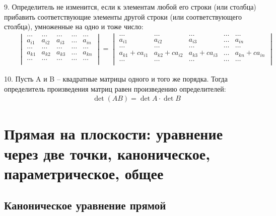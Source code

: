 \documentclass[12pt, fleqn]{extarticle}
\begin{document}
9. Определитель не изменится, если к элементам любой его строки (или столбца) прибавить соответствующие элементы другой строки (или соответствующего столбца), умноженные на одно и тоже число:
\begin{align*}
     &  &
    \begin{vmatrix}
        \dots  & \dots  & \dots  & \dots & \dots  \\
        a_{i1} & a_{i2} & a_{i3} & \dots & a_{in} \\
        \dots  & \dots  & \dots  & \dots & \dots  \\
        a_{k1} & a_{k2} & a_{k3} & \dots & a_{kn} \\
        \dots  & \dots  & \dots  & \dots & \dots  \\
    \end{vmatrix}
    =
    \begin{vmatrix}
        \dots            & \dots            & \dots            & \dots & \dots            \\
        a_{i1}           & a_{i2}           & a_{i3}           & \dots & a_{in}           \\
        \dots            & \dots            & \dots            & \dots & \dots            \\
        a_{k1} + ca_{i1} & a_{k2} + ca_{i2} & a_{k3} + ca_{i3} & \dots & a_{kn} + ca_{in} \\
        \dots            & \dots            & \dots            & \dots & \dots            \\
    \end{vmatrix}
\end{align*}

10. Пусть A и B – квадратные матрицы одного и того же порядка. Тогда определитель произведения матриц равен произведению определителей:
\begin{align*}
     &  &
    \det (AB) = \det A \cdot \det B
\end{align*}

\newpage

\section{Прямая на плоскости: уравнение через две точки, каноническое, параметрическое, общее}\label{sec:line}

\subsection*{Каноническое уравнение прямой}
\end{document}
